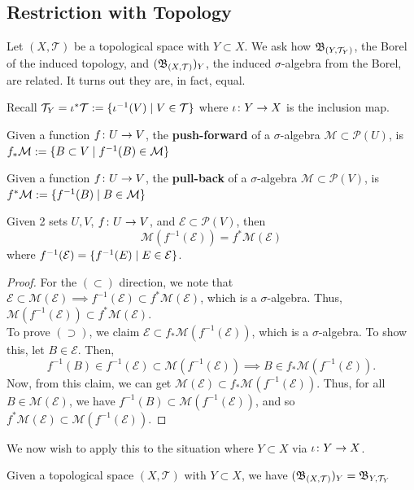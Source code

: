 \documentclass[11pt,leqno,oneside]{amsbook}
\numberwithin{thm}{section}
\renewcommand{\P}{\mathcal{P}} %
\newcommand{\M}{\mathcal{M}} %
\newcommand{\Ep}{\mathcal{E}} %
\newcommand{\Top}{\mathcal{T}} %
\renewcommand{\de}{\textbf} %
\begin{document}
\subsection{Restriction with Topology}
Let \((X,\Top)\) be a topological space with \(Y \subset X\). We ask
how \(\B_{(Y,\Top_Y)}\), the Borel of the induced topology, and
\((\B_{(X,\Top)})_Y\), the induced \(\sigma\)-algebra from the Borel,
are related. It turns out they are, in fact, equal.
\begin{defn}
  Recall \(\Top_Y = \iota^* \Top := \{\iota^{-1}(V) \st V \in \Top\}\)
  where \(\iota \colon Y \to X\) is the inclusion map.
\end{defn}
\begin{defn}
  Given a function \(f \colon U \to V\), the \de{push-forward}
    of a \(\sigma\)-algebra \(\M \subset \P(U)\), is \(f_* \M := \{B
  \subset V \st f^{-1}(B) \in \M\}\)
\end{defn}
\begin{defn}
  Given a function \(f \colon U \to V\), the \de{pull-back}
    of a \(\sigma\)-algebra \(\M \subset \P(V)\), is \(f^* \M :=
    \{f^{-1}(B) \st B \in \M\}\)
\end{defn}
\begin{prop}
  Given 2 sets \(U,V\), \(f \colon U \to V\), and \(\Ep \subset
  \P(V)\), then \[
    \M(f^{-1}(\Ep)) = f^* \M(\Ep)
  \]
  where \(f^{-1}(\Ep) = \{f^{-1}(E) \st E \in \Ep\}\).
\end{prop}
\begin{proof}
  For the \((\subset)\) direction, we note that \(\Ep \subset \M(\Ep)
  \implies f^{-1}(\Ep) \subset f^* \M(\Ep)\), which is a
  \(\sigma\)-algebra. Thus, \(\M(f^{-1}(\Ep)) \subset f^*
  \M(\Ep)\). \\

  To prove \((\supset)\), we claim \(\Ep \subset f_*
  \M(f^{-1}(\Ep))\), which is a \(\sigma\)-algebra. To show this, let
  \(B \in \Ep\). Then, \[f^{-1}(B) \in f^{-1}(\Ep) \subset
    \M(f^{-1}(\Ep)) \implies B \in f_* \M(f^{-1}(\Ep)).\]
  Now, from this claim, we can get \(\M(\Ep) \subset f_*
  \M(f^{-1}(\Ep))\). Thus, for all \(B \in \M(\Ep)\), we have
  \(f^{-1}(B) \subset \M(f^{-1}(\Ep))\), and so \(f^*\M(\Ep) \subset \M(f^{-1}(\Ep))\).
\end{proof}
We now wish to apply this to the situation where \(Y \subset X\) via
\(\iota \colon Y \to X\).
\begin{cor}
  Given a topological space \((X,\Top)\) with \(Y \subset X\), we have
  \((\B_{(X,\Top)})_Y = \B_{Y,\Top_Y}\)
\end{cor}
\end{document}
